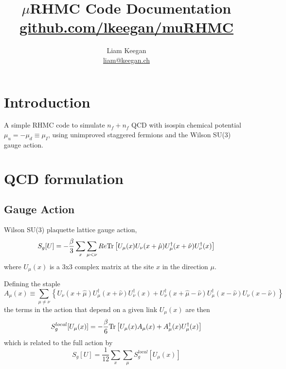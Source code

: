 \documentclass[a4paper,12pt]{article}
\newcommand{\Tr}{{\rm Tr}}
\begin{document}
\author{Liam Keegan\\ \href{mailto:liam@keegan.ch}{liam@keegan.ch}}
\title{$\mu$RHMC Code Documentation \\ \href{https://github.com/lkeegan/muRHMC}{github.com/lkeegan/muRHMC}}

\maketitle

\section{Introduction}
A simple RHMC code to simulate $n_f+n_f$ QCD with isospin chemical potential $\mu_u = -\mu_d \equiv \mu_I$, using unimproved staggered fermions and the Wilson SU(3) gauge action.

\section{QCD formulation}
\subsection{Gauge Action}
Wilson SU(3) plaquette lattice gauge action,
\begin{equation}
 S_g[U] = -\frac{\beta}{3} \sum_x \sum_{\mu<\nu} Re \Tr \left[ U_{\mu}(x)  U_{\nu}(x+\hat\mu)  U_{\mu}^{\dagger}(x+\hat\nu)  U_{\nu}^{\dagger}(x)\right]
\end{equation}
where $U_\mu(x)$ is a 3x3 complex matrix at the site $x$ in the direction $\mu$.

Defining the staple
\begin{equation}
 A_\mu(x) \equiv \sum_{\mu\neq\nu} \left\{
 U_{\nu}(x+\hat\mu) U_{\mu}^{\dagger}(x+\hat\nu)  U_{\nu}^{\dagger}(x) +
 U_{\nu}^{\dagger}(x+\hat\mu-\hat\nu) U_{\mu}^{\dagger}(x-\hat\nu)  U_{\nu}(x-\hat\nu) \right\}
\end{equation}
the terms in the action that depend on a given link $U_{\mu}(x)$ are then
\begin{equation}
 S_g^{local}[U_{\mu}(x)] = -\frac{\beta}{6} \Tr \left[ U_{\mu}(x) A_{\mu}(x) + A_{\mu}^{\dagger}(x)U_{\mu}^{\dagger}(x)  \right]
\end{equation}
which is related to the full action by
\begin{equation}
 S_g[U] = \frac{1}{12} \sum_{x} \sum_{\mu} S_g^{local}[U_{\mu}(x)]
\end{equation}
\end{document}
